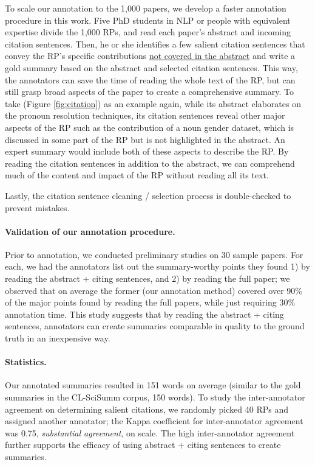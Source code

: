 \documentclass[letterpaper]{article} \usepackage{aaai19}  \usepackage{times}  \usepackage{helvet}  \usepackage{courier}  \usepackage{url}
\begin{document}
To scale our annotation to the 1,000 papers, we develop a faster annotation procedure in this work.
Five PhD students in NLP or people with equivalent expertise divide the 1,000 RPs, and read each paper's abstract and incoming citation sentences.
Then, he or she identifies a few
salient citation sentences that convey the RP's specific contributions \uline{not covered in the abstract} and
write a gold summary based on the abstract and selected citation sentences.
This way, the annotators can save the time of reading the whole text of the RP, but can still grasp broad aspects of the paper to create a comprehensive summary.
To take
\citeauthor{bergsma-lin:2006:COLACL} (Figure \ref{fig:citation})
as an example again,
while its abstract elaborates on the pronoun resolution techniques,
its citation sentences reveal other major aspects of the RP such as the contribution of a noun gender dataset, which is discussed in some part of the RP but is not highlighted in the abstract.
An expert summary would include both of these aspects to describe the RP.
By reading the citation sentences in addition to the abstract, we can comprehend much of the content and impact of the RP without reading all its text.


Lastly, the citation sentence cleaning / selection process is double-checked to prevent mistakes.



\paragraph{Validation of our annotation procedure.}

Prior to
annotation, we conducted preliminary studies on
30 sample papers.
For each, we had the annotators list out the
summary-worthy points they found 1) by reading the abstract + citing sentences, and 2) by reading the full paper; we observed that on average
the former (our annotation method)
covered
over 90\% of the major points found by reading the full papers, while just requiring 30\% annotation time.
This study suggests that by reading the abstract + citing sentences, annotators can create summaries comparable in quality to the ground truth in an inexpensive way.


\paragraph{Statistics.}
Our annotated summaries resulted in 151 words on average (similar to the gold summaries in the CL-SciSumm corpus, 150 words).
To study the inter-annotator agreement on determining salient citations, we randomly picked 40 RPs
and assigned
another annotator; the Kappa coefficient \cite{cohen1960coefficient}
for inter-annotator agreement was 0.75, {\it substantial agreement}, on \citeauthor{landis1977measurement} scale.
The high inter-annotator agreement
further supports the
efficacy of using abstract + citing sentences to create summaries.
\end{document}
